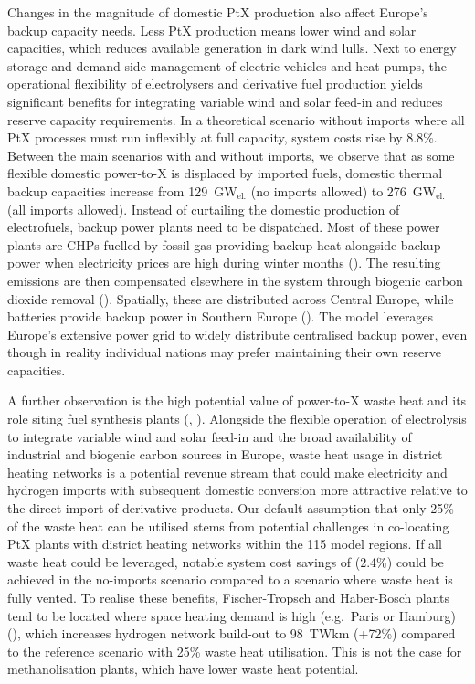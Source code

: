 
Changes in the magnitude of domestic PtX production also affect Europe's backup
capacity needs. Less PtX production means lower wind and solar capacities, which
reduces available generation in dark wind lulls. Next to energy storage and
demand-side management of electric vehicles and heat pumps, the operational
flexibility of electrolysers and derivative fuel production yields significant
benefits for integrating variable wind and solar feed-in and reduces reserve
capacity requirements. In a theoretical scenario without imports where all PtX
processes must run inflexibly at full capacity, system costs rise by 8.8\%.
Between the main scenarios with and without imports, we observe that as some
flexible domestic power-to-X is displaced by imported fuels, domestic thermal
backup capacities increase from 129~GW$_\text{el.}$ (no imports allowed) to
276~GW$_\text{el.}$ (all imports allowed).  Instead of curtailing the domestic
production of electrofuels, backup power plants need to be dispatched. Most of
these power plants are CHPs fuelled by fossil gas providing backup heat
alongside backup power when electricity prices are high during winter months
(). The resulting emissions are then compensated
elsewhere in the system through biogenic carbon dioxide removal
(). Spatially, these are distributed across Central
Europe, while batteries provide backup power in Southern Europe
(). The model leverages Europe's extensive
power grid to widely distribute centralised backup power, even though in reality
individual nations may prefer maintaining their own reserve capacities.


A further observation is the high potential value of power-to-X waste heat and
its role siting fuel synthesis plants (,
). Alongside the flexible operation of electrolysis to
integrate variable wind and solar feed-in and the broad availability of
industrial and biogenic carbon sources in Europe, waste heat usage in district
heating networks is a potential revenue stream that could make electricity and
hydrogen imports with subsequent domestic conversion more attractive relative to
the direct import of derivative products. Our default assumption that only 25\%
of the waste heat can be utilised stems from potential challenges in co-locating
PtX plants with district heating networks within the 115 model regions. If all
waste heat could be leveraged, notable system cost savings of 
(2.4\%) could be achieved in the no-imports scenario compared to a scenario
where waste heat is fully vented.  To realise these benefits, Fischer-Tropsch
and Haber-Bosch plants tend to be located where space heating demand is high
(e.g.~Paris or Hamburg) (), which increases hydrogen
network build-out to 98~TWkm (+72\%) compared to the reference scenario with
25\% waste heat utilisation. This is not the case for methanolisation plants,
which have lower waste heat potential.

